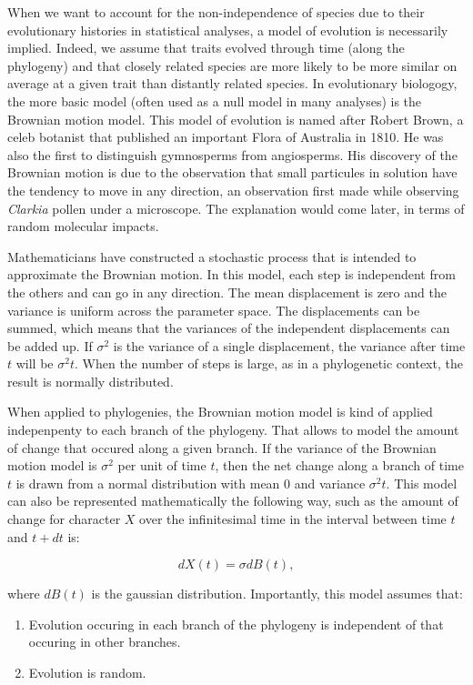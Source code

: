 \documentclass[
]{book}
\providecommand{\tightlist}{%
  \setlength{\itemsep}{0pt}\setlength{\parskip}{0pt}}
\begin{document}
When we want to account for the non-independence of species due to their evolutionary histories in statistical analyses, a model of evolution is necessarily implied. Indeed, we assume that traits evolved through time (along the phylogeny) and that closely related species are more likely to be more similar on average at a given trait than distantly related species. In evolutionary biologogy, the more basic model (often used as a null model in many analyses) is the Brownian motion model. This model of evolution is named after Robert Brown, a celeb botanist that published an important Flora of Australia in 1810. He was also the first to distinguish gymnosperms from angiosperms. His discovery of the Brownian motion is due to the observation that small particules in solution have the tendency to move in any direction, an observation first made while observing \emph{Clarkia} pollen under a microscope. The explanation would come later, in terms of random molecular impacts.

Mathematicians have constructed a stochastic process that is intended to approximate the Brownian motion. In this model, each step is independent from the others and can go in any direction. The mean displacement is zero and the variance is uniform across the parameter space. The displacements can be summed, which means that the variances of the independent displacements can be added up. If \(\sigma^2\) is the variance of a single displacement, the variance after time \(t\) will be \(\sigma^2t\). When the number of steps is large, as in a phylogenetic context, the result is normally distributed.

When applied to phylogenies, the Brownian motion model is kind of applied indepenpenty to each branch of the phylogeny. That allows to model the amount of change that occured along a given branch. If the variance of the Brownian motion model is \(\sigma^2\) per unit of time \(t\), then the net change along a branch of time \(t\) is drawn from a normal distribution with mean \(0\) and variance \(\sigma^2t\). This model can also be represented mathematically the following way, such as the amount of change for character \(X\) over the infinitesimal time in the interval between time \(t\) and \(t+dt\) is:

\[dX(t)=\sigma dB(t),\]

where \(dB(t)\) is the gaussian distribution. Importantly, this model assumes that:

\begin{enumerate}
\def\labelenumi{\arabic{enumi}.}
\tightlist
\item
  Evolution occuring in each branch of the phylogeny is independent of that occuring in other branches.
\item
  Evolution is random.
\end{enumerate}
\end{document}
